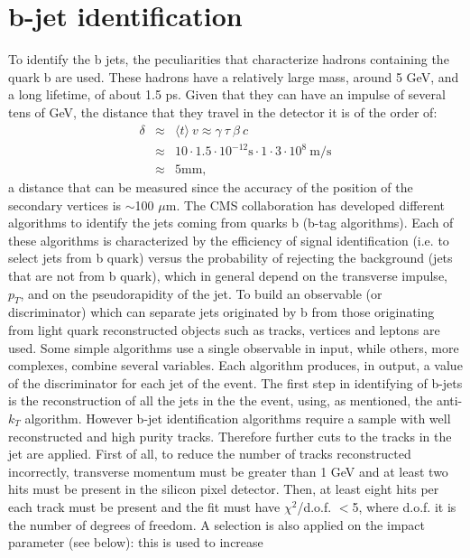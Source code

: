 \section{b-jet identification}
To identify the b jets, the peculiarities that characterize hadrons
containing the quark b are used.
These hadrons have a relatively large mass, around 5 GeV, and a long lifetime, of about 1.5 ps. Given that they can
have an impulse of several tens of GeV, the distance that they travel in the detector
it is of the order of:
\begin{eqnarray}
  \delta &\approx& \langle t \rangle \: v \approx \gamma \: \tau \: \beta  \: c  \nonumber \\
 &\approx& 10 \cdot 1.5 \cdot 10^{-12} \mbox{s} \cdot 1 \cdot 3 \cdot 10^8 \: \mbox{m/s}   \nonumber \\
 &\approx& 5  \mbox{mm,} \end{eqnarray}
a distance that can be measured since the accuracy of the position of the
secondary vertices is $\sim$100 $\mu$m.
The CMS collaboration has developed different algorithms to identify the jets coming from
  quarks b (b-tag algorithms). Each of these algorithms is characterized
by the efficiency of signal identification (i.e. to select jets from b quark) versus the probability of
rejecting the background (jets that are not from b quark), which in general depend on the transverse impulse,
$p_T$, and on the pseudorapidity of the jet. To build an observable (or discriminator) which can separate 
jets originated by b from those originating from light quark 
reconstructed objects such as tracks, vertices and leptons are used.
Some simple algorithms use a single observable in input, while others,
more complexes, combine several variables. Each algorithm
produces, in output, a value of the discriminator for each jet of the event.
The first step in identifying of b-jets is the reconstruction of all the jets in the
the event, using, as mentioned, the anti-$k_T$ algorithm. However b-jet
identification algorithms require a sample with well reconstructed and high purity tracks.
Therefore further cuts to the tracks in the jet are applied. First of all, to reduce
the number of tracks reconstructed incorrectly, transverse momentum must be 
greater than 1 GeV and at least two hits must be present in the silicon pixel detector. Then, at 
least eight hits per each track must be present and the fit must have 
 $\chi^2$/d.o.f. $<$5, where d.o.f. it is the number of degrees of freedom.
A selection is also applied on the impact parameter (see below): this is used to increase
